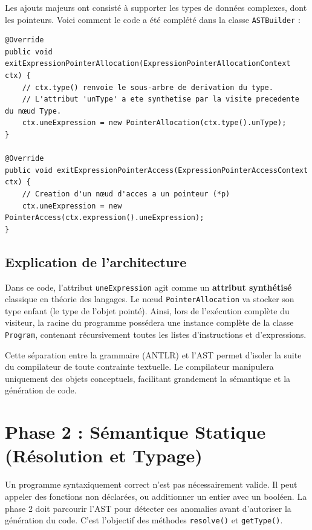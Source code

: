 \documentclass[12pt,a4paper]{article}
\begin{document}
Les ajouts majeurs ont consisté à supporter les types de données complexes, dont les pointeurs. Voici comment le code a été complété dans la classe \texttt{ASTBuilder} :

\begin{lstlisting}[caption={Extrait de ASTBuilder.java - Allocation de pointeurs}]
@Override
public void exitExpressionPointerAllocation(ExpressionPointerAllocationContext ctx) {
    // ctx.type() renvoie le sous-arbre de derivation du type.
    // L'attribut 'unType' a ete synthetise par la visite precedente du nœud Type.
    ctx.uneExpression = new PointerAllocation(ctx.type().unType);
}

@Override
public void exitExpressionPointerAccess(ExpressionPointerAccessContext ctx) {
    // Creation d'un nœud d'acces a un pointeur (*p)
    ctx.uneExpression = new PointerAccess(ctx.expression().uneExpression);
}
\end{lstlisting}

\subsection{Explication de l'architecture}
Dans ce code, l'attribut \texttt{uneExpression} agit comme un \textbf{attribut synthétisé} classique en théorie des langages. Le nœud \texttt{PointerAllocation} va stocker son type enfant (le type de l'objet pointé). Ainsi, lors de l'exécution complète du visiteur, la racine du programme possédera une instance complète de la classe \texttt{Program}, contenant récursivement toutes les listes d'instructions et d'expressions. 

Cette séparation entre la grammaire (ANTLR) et l'AST permet d'isoler la suite du compilateur de toute contrainte textuelle. Le compilateur manipulera uniquement des objets conceptuels, facilitant grandement la sémantique et la génération de code.

\newpage
\section{Phase 2 : Sémantique Statique (Résolution et Typage)}

Un programme syntaxiquement correct n'est pas nécessairement valide. Il peut appeler des fonctions non déclarées, ou additionner un entier avec un booléen. La phase 2 doit parcourir l'AST pour détecter ces anomalies avant d'autoriser la génération du code. C'est l'objectif des méthodes \texttt{resolve()} et \texttt{getType()}.
\end{document}
